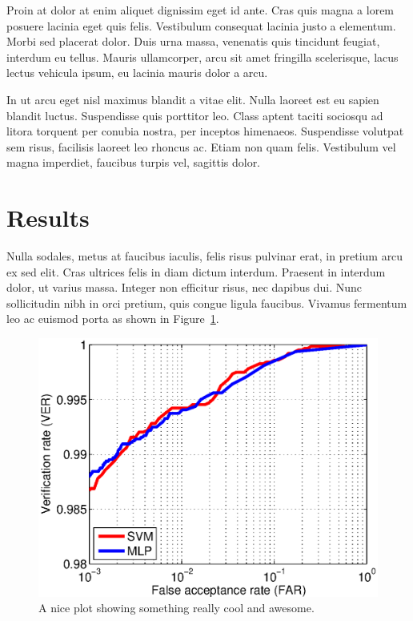 \documentclass[9pt]{IEEEtran}
\begin{document}
Proin at dolor at enim aliquet dignissim eget id ante. Cras quis magna a lorem posuere lacinia eget quis felis. Vestibulum consequat lacinia justo a elementum. Morbi sed placerat dolor. Duis urna massa, venenatis quis tincidunt feugiat, interdum eu tellus. Mauris ullamcorper, arcu sit amet fringilla scelerisque, lacus lectus vehicula ipsum, eu lacinia mauris dolor a arcu.

In ut arcu eget nisl maximus blandit a vitae elit. Nulla laoreet est eu sapien blandit luctus. Suspendisse quis porttitor leo. Class aptent taciti sociosqu ad litora torquent per conubia nostra, per inceptos himenaeos. Suspendisse volutpat sem risus, facilisis laoreet leo rhoncus ac. Etiam non quam felis. Vestibulum vel magna imperdiet, faucibus turpis vel, sagittis dolor.

\section{Results}
Nulla sodales, metus at faucibus iaculis, felis risus pulvinar erat, in pretium arcu ex sed elit. Cras ultrices felis in diam dictum interdum. Praesent in interdum dolor, ut varius massa. Integer non efficitur risus, nec dapibus dui. Nunc sollicitudin nibh in orci pretium, quis congue ligula faucibus. Vivamus fermentum leo ac euismod porta as shown in Figure~\ref{fig:plot1}.

\begin{figure}[h]
    \centering
    \includegraphics[width=1\columnwidth]{plot1}
    \caption{A nice plot showing something really cool and awesome.}
    \label{fig:plot1}
\end{figure}
 
\end{document}
